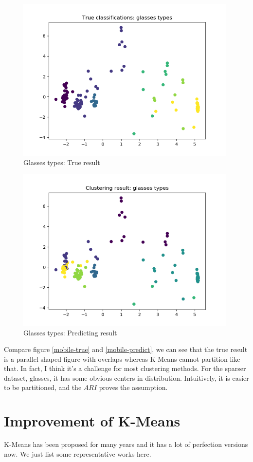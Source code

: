 \documentclass[12pt,a4paper]{article}
\begin{document}
\begin{figure}
\centering
\includegraphics[width=11cm]{glasses-true}
\caption{Glasses types: True result}
\label{glasses-true}
\end{figure}

\begin{figure}
\centering
\includegraphics[width=11cm]{glasses-predict}
\caption{Glasses types: Predicting result}
\label{glasses-predict}
\end{figure}

Compare figure \ref{mobile-true} and \ref{mobile-predict}, we can see that the true result is a parallel-shaped figure with overlaps whereas K-Means cannot partition like that. In fact, I think it's a challenge for most clustering methods. For the sparser dataset, glasses, it has some obvious centers in distribution. Intuitively, it is easier to be partitioned, and the $ARI$ proves the assumption.

\section{Improvement of K-Means}
K-Means has been proposed for many years and it has a lot of perfection versions now. We just list some representative works here.
\end{document}
